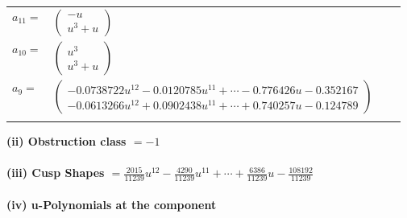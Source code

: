 \documentclass[1p]{elsarticle_modified}
\theoremstyle{definition}
\begin{document}
\begin{tabular}{m{7pt} m{180pt} m{7pt} m{180pt} }
\flushright $a_{11}=$&$\begin{pmatrix}- u\\u^3+u\end{pmatrix}$ \\
\flushright $a_{10}=$&$\begin{pmatrix}u^3\\u^3+u\end{pmatrix}$ \\
\flushright $a_{9}=$&$\begin{pmatrix}-0.0738722 u^{12}-0.0120785 u^{11}+\cdots-0.776426 u-0.352167\\-0.0613266 u^{12}+0.0902438 u^{11}+\cdots+0.740257 u-0.124789\end{pmatrix}$\\&\end{tabular}
\flushleft \textbf{(ii) Obstruction class $= -1$}\\~\\
\flushleft \textbf{(iii) Cusp Shapes $= \frac{2015}{11239} u^{12}-\frac{4290}{11239} u^{11}+\cdots+\frac{6386}{11239} u-\frac{108192}{11239}$}\\~\\
\newpage\renewcommand{\arraystretch}{1}
\flushleft \textbf{(iv) u-Polynomials at the component}\newline \\
\end{document}
